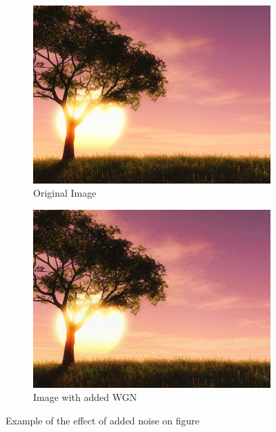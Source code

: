 \begin{figure}[h]
    \centering
    \begin{subfigure}[c]{\textwidth}
        \centering
        \includegraphics[width=\figwidth]{Sections/3AV1/Diagrams/paisagemOri.jpg}
        \caption{Original Image \cite{Freepik}}
        \label{subfig:noiseOri}
    \end{subfigure}
    \begin{subfigure}[c]{\textwidth}
        \centering
        \includegraphics[width=\figwidth]{Sections/3AV1/Diagrams/paisagemNoise.jpg}
        \caption{Image with added WGN}
        \label{subfig:noise}
    \end{subfigure}
    \caption{Example of the effect of added noise on figure}
    \label{fig:noise}
\end{figure}


